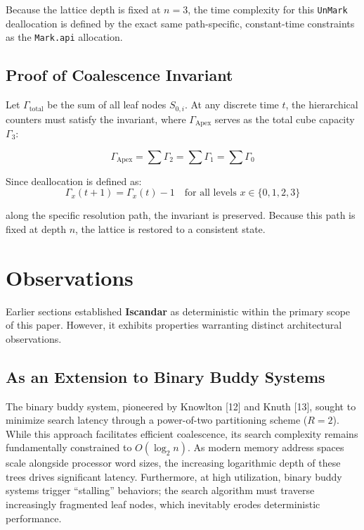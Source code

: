 \documentclass[11pt]{article}
\begin{document}
Because the lattice depth is fixed at $n = 3$, the time complexity for this \texttt{UnMark} deallocation is defined by the exact same path-specific, constant-time constraints as the \texttt{Mark.api} allocation.

\subsection{Proof of Coalescence Invariant}

Let $\Gamma_{\text{total}}$ be the sum of all leaf nodes $S_{0,i}$. At any discrete time $t$, the hierarchical counters must satisfy the invariant, where $\Gamma_{\text{Apex}}$ serves as the total cube capacity $\Gamma_{3}$:

\begin{equation}
    \Gamma_{\text{Apex}} = \sum \Gamma_{2} = \sum \Gamma_{1} = \sum \Gamma_{0}
\end{equation}

\vspace{5pt}
\noindent Since deallocation is defined as:
\begin{equation}
    \Gamma_{x}(t+1) = \Gamma_{x}(t) - 1 \quad \text{for all levels } x \in \{0, 1, 2, 3\}
\end{equation}

\noindent along the specific resolution path, the invariant is preserved. Because this path is fixed at depth $n$, the lattice is restored to a consistent state.

\section{Observations}

Earlier sections established \textbf{Iscandar} as deterministic within the primary scope of this paper. However, it exhibits properties warranting distinct architectural observations.

\subsection{As an Extension to Binary Buddy Systems}
The binary buddy system, pioneered by Knowlton [12] and Knuth [13], sought to minimize search latency through a power-of-two partitioning scheme ($R=2$). While this approach facilitates efficient coalescence, its search complexity remains fundamentally constrained to $O(\log_{2} n)$. As modern memory address spaces scale alongside processor word sizes, the increasing logarithmic depth of these trees drives significant latency. Furthermore, at high utilization, binary buddy systems trigger ``stalling'' behaviors; the search algorithm must traverse increasingly fragmented leaf nodes, which inevitably erodes deterministic performance.\\
\end{document}
